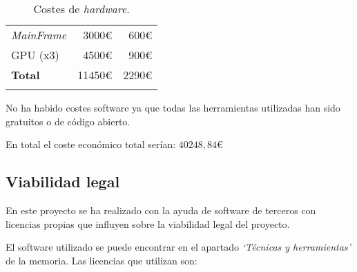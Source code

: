 \begin{longtable}[]{@{}lrr@{}}
\begin{minipage}[t]{0.29\columnwidth}
		\textit{MainFrame}\strut
	\end{minipage} & \begin{minipage}[t]{0.18\columnwidth}\raggedright\strut
		3000\euro{}\strut
	\end{minipage} & \begin{minipage}[t]{0.32\columnwidth}\raggedright\strut
		600\euro{}\strut
	\end{minipage}\tabularnewline
	\begin{minipage}[t]{0.29\columnwidth}\raggedright\strut
		GPU (x3)\strut
	\end{minipage} & \begin{minipage}[t]{0.18\columnwidth}\raggedright\strut
		4500\euro{}\strut
	\end{minipage} & \begin{minipage}[t]{0.32\columnwidth}\raggedright\strut
		900\euro{}\strut
	\end{minipage}\tabularnewline
	\midrule
	\begin{minipage}[t]{0.29\columnwidth}\raggedright\strut
		\textbf{Total}\strut
	\end{minipage} & \begin{minipage}[t]{0.18\columnwidth}\raggedright\strut
		11450\euro{}\strut
	\end{minipage} & \begin{minipage}[t]{0.32\columnwidth}\raggedright\strut
		2290\euro{}\strut
	\end{minipage}\tabularnewline
	\bottomrule
	\caption{Costes de \emph{hardware}.}
\end{longtable}

No ha habido costes software ya que todas las herramientas utilizadas han sido gratuitos o de código abierto.

En total el coste económico total serían: $40248,84$\euro

\subsection{Viabilidad legal}

En este proyecto se ha realizado con la ayuda de software de terceros con licencias propias que influyen sobre la viabilidad legal del proyecto.

El software utilizado se puede encontrar en el apartado \textit{`Técnicas y herramientas'} de la memoria. Las licencias que utilizan son:

